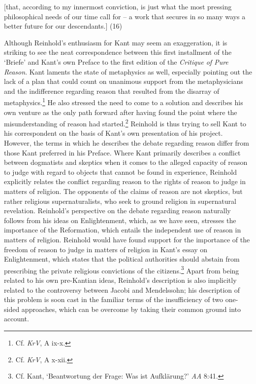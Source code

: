 [that, according to my innermost conviction, is just what the most pressing philosophical needs of our time call for {--} a work that secures in so many ways a better future for our descendants.] (16)

Although Reinhold's enthusiasm for Kant may seem an exaggeration, it is striking to see the neat correspondence between this first installment of the `Briefe' and Kant's own Preface to the first edition of the \textit{Critique of Pure Reason}. Kant laments the state of metaphysics as well, especially pointing out the lack of a plan that could count on unanimous support from the metaphysicians and the indifference regarding reason that resulted from the disarray of metaphysics.\footnote{ Cf. \textit{KrV}, A ix{-}x. } He also stressed the need to come to a solution and describes his own venture as the only path forward after having found the point where the misunderstanding of reason had started.\footnote{ Cf. \textit{KrV}, A x{-}xii. } Reinhold is thus trying to sell Kant to his correspondent on the basis of Kant's own presentation of his project. However, the terms in which he describes the debate regarding reason differ from those Kant preferred in his Preface. Where Kant primarily describes a conflict between dogmatists and skeptics when it comes to the alleged capacity of reason to judge with regard to objects that cannot be found in experience, Reinhold explicitly relates the conflict regarding reason to the rights of reason to judge in matters of religion. The opponents of the claims of reason are not skeptics, but rather religious supernaturalists, who seek to ground religion in supernatural revelation. Reinhold's perspective on the debate regarding reason naturally follows from his ideas on Enlightenment, which, as we have seen, stresses the importance of the Reformation, which entails the independent use of reason in matters of religion. Reinhold would have found support for the importance of the freedom of reason to judge in matters of religion in Kant's essay on Enlightenment, which states that the political authorities should abstain from prescribing the private religious convictions of the citizens.\footnote{ Cf. Kant, `Beantwortung der Frage: Was ist Aufkl\"{a}rung?' \textit{AA} 8:41.} Apart from being related to his own pre{-}Kantian ideas, Reinhold's description is also implicitly related to the controversy between Jacobi and Mendelssohn; his description of this problem is soon cast in the familiar terms of the insufficiency of two one{-}sided approaches, which can be overcome by taking their common ground into account. 

